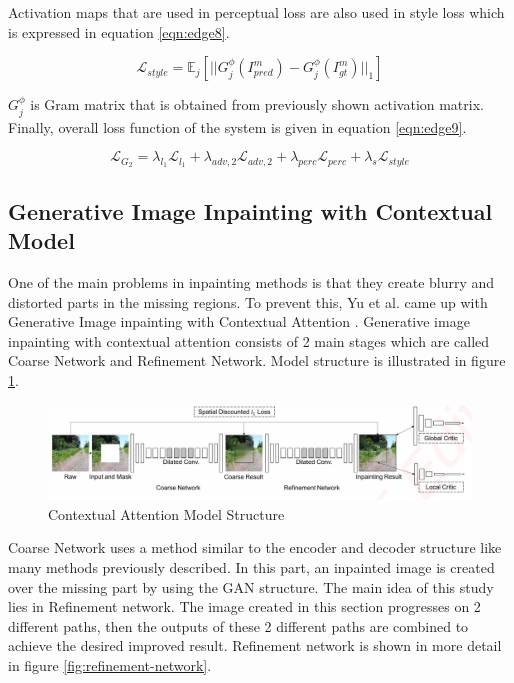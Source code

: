 Activation maps that are used in perceptual loss are also used in style loss which is expressed in equation \ref{eqn:edge8}.

\begin{equation}
\label{eqn:edge8}
    \mathcal{L}_{style} = \mathbb{E}_j [ || G_j^{\phi} (I^m_{pred})- G_j^{\phi} (I^m_{gt}) ||_1 ]
\end{equation}

\(G_j^\phi\) is Gram matrix that is obtained from previously shown activation matrix. Finally, overall loss function of the system is given in equation \ref{eqn:edge9}.

\begin{equation}
\label{eqn:edge9}
    \mathcal{L}_{G_2}=\lambda_{l_1}\mathcal{L}_{l_1} + \lambda_{adv,2}\mathcal{L}_{adv,2} + \lambda_{perc}\mathcal{L}_{perc} + \lambda_{s}\mathcal{L}_{style}
\end{equation}

\subsection{Generative Image Inpainting with Contextual Model}

One of the main problems in inpainting methods is that they create blurry and distorted parts in the missing regions. To prevent this, Yu et al. came up with Generative Image inpainting with Contextual Attention \cite{generative_contextual}.
Generative image inpainting with contextual attention consists of 2 main stages which are called Coarse Network and Refinement Network. Model structure is illustrated in figure \ref{fig:contextual-structure}.

\begin{figure}[h!]
    \centering
    \includegraphics[scale=0.4]{figures/chapter4/GenerativeOverview.PNG}
    \vspace*{3mm}
    \caption{Contextual Attention Model Structure \cite{generative_contextual}}
    \label{fig:contextual-structure}
\end{figure}

Coarse Network uses a method similar to the encoder and decoder structure like many methods previously described. In this part, an inpainted image is created over the missing part by using the GAN structure. \newline
The main idea of this study lies in Refinement network. The image created in this section progresses on 2 different paths, then the outputs of these 2 different paths are combined to achieve the desired improved result. Refinement network is shown in more detail in figure \ref{fig:refinement-network}.

